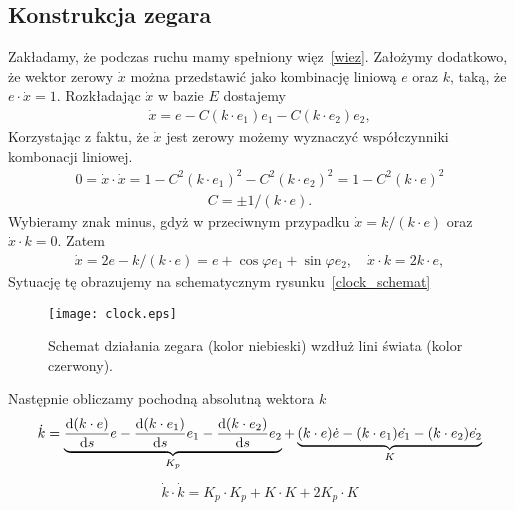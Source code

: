 \subsection{Konstrukcja zegara}


Zakładamy, że podczas ruchu mamy spełniony więz~\eqref{wiez}.
Założymy dodatkowo, że wektor zerowy $\dot{x}$ można przedstawić
jako kombinację liniową $e$ oraz $k$, taką, że $e\cdot \dot{x} = 1$.
Rozkładając $\dot{x}$ w bazie $E$ dostajemy
\begin{align*}
\dot{x} = e - C (k\cdot e_1) e_1 - C (k\cdot e_2)e_2,
\end{align*}
Korzystając z faktu, że $\dot{x}$ jest zerowy możemy wyznaczyć
współczynniki kombonacji liniowej.
\begin{align*}
0 = \dot{x} \cdot \dot{x} = 1 - C^2 (k\cdot e_1)^2 - C^2 (k\cdot e_2)^2
= 1 - C^2 (k\cdot e)^2
\end{align*}
\begin{align*}
C= \pm 1/(k\cdot e).
\end{align*}
Wybieramy znak minus, gdyż w przeciwnym przypadku
$\dot{x} = k / (k\cdot e)$ oraz $\dot{x}\cdot k = 0$. Zatem
\begin{align}
\boxed{\dot{x} = 2 e - k / (k\cdot e) = 
e + \cos \varphi e_1 + \sin\varphi e_2
,\quad \dot{x}\cdot k = 2 k \cdot e,   }
\end{align}
Sytuację tę obrazujemy na schematycznym rysunku~\eqref{clock_schemat}
\begin{figure}
\centering
\texttt{[image: clock.eps]}
\caption{Schemat działania zegara (kolor niebieski)
 wzdłuż lini świata (kolor czerwony).}
\label{clock_schemat}
\end{figure}


Następnie obliczamy pochodną absolutną wektora $k$
\begin{align*}
\dot{k} =\underbrace{ \frac{\text{d} (k\cdot e)}{\text{d} s} e - 
\frac{\text{d} (k\cdot e_1)}{\text{d} s}e_1 -
\frac{\text{d} (k\cdot e_2)}{\text{d} s}e_2}_{K_p}
+\underbrace{(k\cdot e)\dot{e} - (k\cdot e_1)\dot{e_1} 
-(k\cdot e_2)\dot{e_2} }_{K}
\end{align*}
\begin{align*}
\dot{k}\cdot\dot{k} = K_p\cdot K_p + K\cdot K + 2K_p\cdot K
\end{align*}

